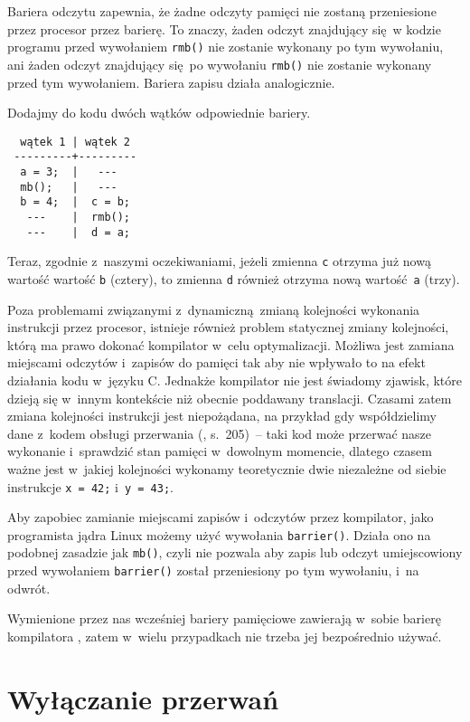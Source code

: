 \documentclass[shortabstract]{iithesis}
\theoremstyle{definition} \newtheorem*{definition}{Definicja}
\theoremstyle{definition} \newtheorem*{example}{Przykład}
\theoremstyle{definition} \newtheorem*{remark}{Uwaga}
\begin{document}
Bariera odczytu zapewnia, że żadne odczyty pamięci nie zostaną przeniesione przez procesor przez barierę.
To znaczy, żaden odczyt znajdujący się w kodzie programu przed wywołaniem \texttt{rmb()} nie zostanie wykonany
po tym wywołaniu, ani żaden odczyt znajdujący się po wywołaniu \texttt{rmb()} nie zostanie wykonany przed tym
wywołaniem. Bariera zapisu działa analogicznie.

Dodajmy do kodu dwóch wątków odpowiednie bariery.
\begin{lstlisting}
  wątek 1 | wątek 2
 ---------+---------
  a = 3;  |   ---
  mb();   |   ---
  b = 4;  |  c = b;
   ---    |  rmb();
   ---    |  d = a;
\end{lstlisting}
Teraz, zgodnie z~naszymi oczekiwaniami, jeżeli zmienna \texttt{c} otrzyma już nową wartość wartość \texttt{b}
(cztery), to zmienna \texttt{d} również otrzyma nową wartość \texttt{a} (trzy).

Poza problemami związanymi z~dynamiczną zmianą kolejności wykonania instrukcji przez procesor,
istnieje również problem
statycznej zmiany kolejności, którą ma prawo dokonać kompilator w~celu optymalizacji. Możliwa jest zamiana miejscami
odczytów i~zapisów do pamięci tak aby nie wpływało to na efekt działania kodu
w~języku C. Jednakże kompilator nie jest świadomy zjawisk, które dzieją się w~innym kontekście
niż obecnie poddawany translacji.
Czasami zatem zmiana kolejności instrukcji jest niepożądana, na przykład gdy współdzielimy dane z~kodem obsługi
przerwania (\cite{bib:lkd}, s.~205)~--
taki kod może przerwać nasze wykonanie i~sprawdzić stan pamięci w~dowolnym momencie,
dlatego czasem ważne jest w~jakiej kolejności wykonamy teoretycznie dwie niezależne od siebie instrukcje
\texttt{x =~42;} i~\texttt{y =~43;}.

Aby zapobiec zamianie miejscami zapisów i~odczytów przez kompilator, jako programista jądra Linux możemy użyć
wywołania \texttt{barrier()}. Działa ono na podobnej zasadzie jak \texttt{mb()}, czyli nie pozwala aby zapis
lub odczyt umiejscowiony przed wywołaniem \texttt{barrier()} został przeniesiony po tym wywołaniu, i~na odwrót.

Wymienione przez nas wcześniej bariery pamięciowe zawierają w~sobie barierę kompilatora \cite{linux:doc_barriers},
zatem w~wielu przypadkach nie trzeba jej bezpośrednio używać.

\section{Wyłączanie przerwań}
\label{sec:interrupt_disable}
\end{document}
